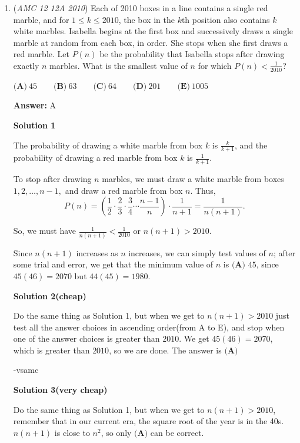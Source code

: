 \begin{enumerate}
	\item (\textit{AMC 12 12A 2010}) Each of 2010 boxes in a line contains a single red marble, and for $1 \le k \le 2010$, the box in the $k\text{th}$ position also contains $k$ white marbles. Isabella begins at the first box and successively draws a single marble at random from each box, in order. She stops when she first draws a red marble. Let $P(n)$ be the probability that Isabella stops after drawing exactly $n$ marbles. What is the smallest value of $n$ for which $P(n) < \frac{1}{2010}$?


 $\textbf{(A)}\ 45 \qquad \textbf{(B)}\ 63 \qquad \textbf{(C)}\ 64 \qquad \textbf{(D)}\ 201 \qquad \textbf{(E)}\ 1005$

 \textbf{Answer: }A



\textbf{Solution 1}

The probability of drawing a white marble from box $k$ is $\frac{k}{k + 1}$, and the probability of drawing a red marble from box $k$ is $\frac{1}{k+1}$.

 To stop after drawing $n$ marbles, we must draw a white marble from boxes $1, 2, \ldots, n-1,$ and draw a red marble from box $n.$ Thus, 
 \[P(n) = \left(\frac{1}{2} \cdot \frac{2}{3} \cdot \frac{3}{4} \cdots \frac {n - 1}{n}\right) \cdot \frac{1}{n +1} = \frac{1}{n (n + 1)}.\]

 So, we must have $\frac{1}{n(n + 1)} < \frac{1}{2010}$ or $n(n+1) > 2010.$

 Since $n(n+1)$ increases as $n$ increases, we can simply test values of $n$; after some trial and error, we get that the minimum value of $n$ is $\boxed{\textbf{(A) }45}$, since $45(46) = 2070$ but $44(45) = 1980.$




\textbf{Solution 2(cheap)}

Do the same thing as Solution 1, but when we get to $n(n+1)>2010$ just test all the answer choices in ascending order(from A to E), and stop when one of the answer choices is greater than $2010$. We get $45(46)=2070$, which is greater than $2010$, so we are done. The answer is $\textbf{(A)}$

 -vsamc

 



\textbf{Solution 3(very cheap)}

Do the same thing as Solution 1, but when we get to $n(n+1)>2010$, remember that in our current era, the square root of the year is in the 40s. $n(n+1)$ is close to $n^2$, so only $\textbf{(A)}$ can be correct.


\end{enumerate}
